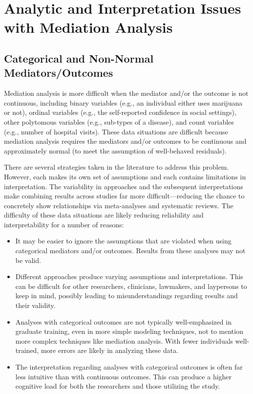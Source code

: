 \documentclass[]{article}
\providecommand{\tightlist}{%
  \setlength{\itemsep}{0pt}\setlength{\parskip}{0pt}}
\begin{document}
\section{Analytic and Interpretation Issues with Mediation
Analysis}\label{analytic-and-interpretation-issues-with-mediation-analysis}

\subsection{Categorical and Non-Normal
Mediators/Outcomes}\label{categorical-and-non-normal-mediatorsoutcomes}

Mediation analysis is more difficult when the mediator and/or the
outcome is not continuous, including binary variables (e.g., an
individual either uses marijuana or not), ordinal variables (e.g., the
self-reported confidence in social settings), other polytomous variables
(e.g., sub-types of a disease), and count variables (e.g., number of
hospital visits). These data situations are difficult because mediation
analysis requires the mediators and/or outcomes to be continuous and
approximately normal (to meet the assumption of well-behaved residuals).

There are several strategies taken in the literature to address this
problem. However, each makes its own set of assumptions and each
contains limitations in interpretation. The variability in approaches
and the subsequent interpretations make combining results across studies
far more difficult---reducing the chance to concretely show
relationships via meta-analyses and systematic reviews. The difficulty
of these data situations are likely reducing reliability and
interpretability for a number of reasons:

\begin{itemize}
\tightlist
\item
  It may be easier to ignore the assumptions that are violated when
  using categorical mediators and/or outcomes. Results from these
  analyses may not be valid.
\item
  Different approaches produce varying assumptions and interpretations.
  This can be difficult for other researchers, clinicians, lawmakers,
  and laypersons to keep in mind, possibly leading to misunderstandings
  regarding results and their validity.
\item
  Analyses with categorical outcomes are not typically well-emphasized
  in graduate training, even in more simple modeling techniques, not to
  mention more complex techniques like mediation analysis. With fewer
  individuals well-trained, more errors are likely in analyzing these
  data.
\item
  The interpretation regarding analyses with categorical outcomes is
  often far less intuitive than with continuous outcomes. This can
  produce a higher cognitive load for both the researchers and those
  utilizing the study.
\end{itemize}
\end{document}
